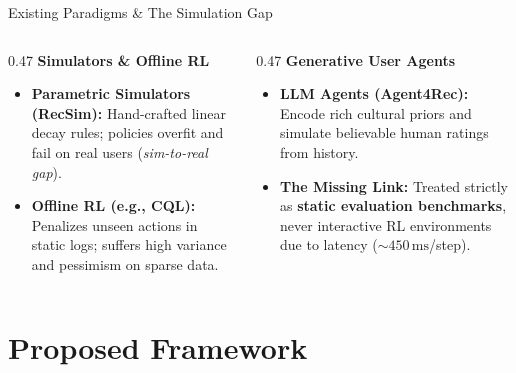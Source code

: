 \documentclass[handout]{beamer}
\begin{document}
\begin{frame}{Existing Paradigms \& The Simulation Gap}
  \vspace{0.05cm}
  \begin{columns}[T,onlytextwidth]
    \begin{column}{0.47\textwidth}
      {\textbf{\textcolor{PomonaNavy}{\large Simulators \& Offline RL}}}\centering
      \vspace{0.15cm}
      \small
      \begin{itemize}
        \item \textbf{Parametric Simulators (RecSim):} Hand-crafted linear decay rules; policies overfit and fail on real users (\textit{sim-to-real gap}).
        \vspace{0.12cm}
        \item \textbf{Offline RL (e.g., CQL):} Penalizes unseen actions in static logs; suffers high variance and pessimism on sparse data.
      \end{itemize}
    \end{column}

    \hfill\vrule\hfill

    \begin{column}{0.47\textwidth}
      \pause
      {\textbf{\textcolor{PomonaNavy}{\large Generative User Agents}}}\centering
      \vspace{0.15cm}
      \small
      \begin{itemize}
        \item \textbf{LLM Agents (Agent4Rec):} Encode rich cultural priors and simulate believable human ratings from history.
        \vspace{0.12cm}
        \pause
        \item \textbf{The Missing Link:} Treated strictly as \textbf{static evaluation benchmarks}, never interactive RL environments due to latency ($\sim 450\,\text{ms}$/step).
      \end{itemize}
    \end{column}
  \end{columns}
\end{frame}


\section{Proposed Framework}
\end{document}
